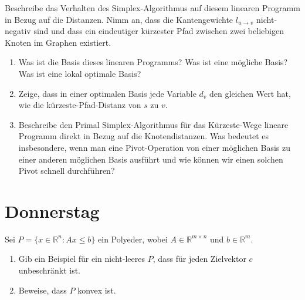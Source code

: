 \documentclass{uebung_cs}
\begin{document}
\begin{aufgabe}
	Beschreibe das Verhalten des Simplex-Algorithmus auf diesem linearen Programm in Bezug auf die Distanzen. Nimm an, dass die Kantengewichte $l_{u \rightarrow v}$ nicht-negativ sind und dass ein eindeutiger kürzester Pfad zwischen zwei beliebigen Knoten im Graphen existiert.
	\begin{enumerate}
		\item Was ist die Basis dieses linearen Programms? Was ist eine mögliche Basis? Was ist eine lokal optimale Basis?
		\item Zeige, dass in einer optimalen Basis jede Variable $d_v$ den gleichen Wert hat, wie die kürzeste-Pfad-Distanz von $s$ zu $v$.
		\item Beschreibe den Primal Simplex-Algorithmus für das Kürzeste-Wege lineare Programm direkt in Bezug auf die Knotendistanzen. Was bedeutet es insbesondere, wenn man eine Pivot-Operation von einer möglichen Basis zu einer anderen möglichen Basis ausführt und wie können wir einen solchen Pivot schnell durchführen?
	\end{enumerate}
	
\end{aufgabe}

\section*{Donnerstag}

\begin{aufgabe}[Polyeder]
	Sei $P=\{ x\in \mathbb{R}^n : Ax\leq b \}$ ein Polyeder, wobei $A\in \mathbb{R}^{m\times n}$ und $b\in \mathbb{R}^m$.
	\begin{enumerate}
		\item Gib ein Beispiel für ein nicht-leeres $P$, dass für jeden Zielvektor $c$ unbeschränkt ist.
		\item Beweise, dass $P$ konvex ist.
	\end{enumerate}
\end{aufgabe}
\end{document}
